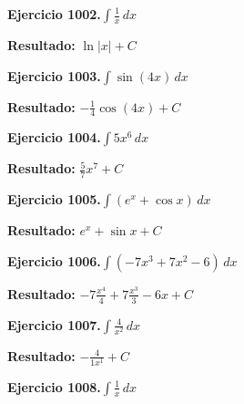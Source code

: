 \documentclass[10pt,a4paper]{article}
\begin{document}
\begin{ejbox}
\textbf{Ejercicio 1002.}\quad $\int \frac{1}{x}\,dx$
\end{ejbox}

\begin{solbox}
\textbf{Resultado:} \(\displaystyle \ln|x| + C\)
\end{solbox}

\newpage
\begin{ejbox}
\textbf{Ejercicio 1003.}\quad $\int \sin(4x)\,dx$
\end{ejbox}

\begin{solbox}
\textbf{Resultado:} \(\displaystyle -\frac{1}{4}\cos(4x) + C\)
\end{solbox}

\begin{ejbox}
\textbf{Ejercicio 1004.}\quad $\int 5x^{6}\,dx$
\end{ejbox}

\begin{solbox}
\textbf{Resultado:} \(\displaystyle \frac{5}{7}x^{7} + C\)
\end{solbox}

\begin{ejbox}
\textbf{Ejercicio 1005.}\quad $\int (e^x + \cos x)\,dx$
\end{ejbox}

\begin{solbox}
\textbf{Resultado:} \(\displaystyle e^x + \sin x + C\)
\end{solbox}

\newpage
\begin{ejbox}
\textbf{Ejercicio 1006.}\quad $\int (-7x^3 +7x^2 -6)\,dx$
\end{ejbox}

\begin{solbox}
\textbf{Resultado:} \(\displaystyle -7\frac{x^4}{4} +7\frac{x^3}{3} -6x + C\)
\end{solbox}

\begin{ejbox}
\textbf{Ejercicio 1007.}\quad $\int \frac{4}{x^{2}}\,dx$
\end{ejbox}

\begin{solbox}
\textbf{Resultado:} \(\displaystyle -\frac{4}{1x^{1}} + C\)
\end{solbox}

\begin{ejbox}
\textbf{Ejercicio 1008.}\quad $\int \frac{1}{x}\,dx$
\end{ejbox}
\end{document}
